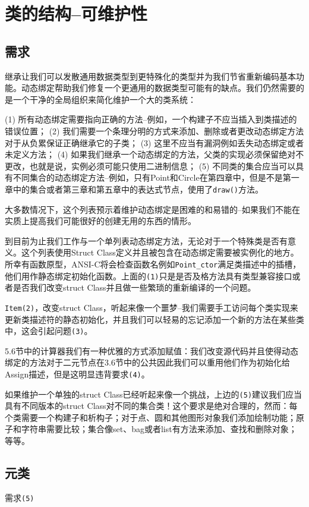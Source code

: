 \chapter{类的结构--可维护性}

\section{需求}

继承让我们可以发散通用数据类型到更特殊化的类型并为我们节省重新编码基本功能。动态绑定帮助我们修复一个更通用的数据类型可能有的缺点。我们仍然需要的是一个干净的全局组织来简化维护一个大的类系统：

(1) 所有动态绑定需要指向正确的方法--例如，一个构建子不应当插入到类描述的错误位置；
(2) 我们需要一个条理分明的方式来添加、删除或者更改动态绑定方法对于从负累保证正确继承它的子类；
(3) 这里不应当有漏洞例如丢失动态绑定或者未定义方法；
(4) 如果我们继承一个动态绑定的方法，父类的实现必须保留绝对不更改，也就是说，实例必须可能只使用二进制信息；
(5) 不同类的集合应当可以具有不同集合的动态绑定方法--例如，只有Point和Circle在第四章中，但是不是第一章中的集合或者第三章和第五章中的表达式节点，使用了\verb|draw()|方法。

大多数情况下，这个列表预示着维护动态绑定是困难的和易错的--如果我们不能在实质上提高我们可能很好的创建无用的东西的情形。

到目前为止我们工作与一个单列表动态绑定方法，无论对于一个特殊类是否有意义。这个列表使用Struct Class定义并且被包含在动态绑定需要被实例化的地方。所幸有函数原型，ANSI-C将会检查函数名例如\verb|Point_ctor|满足类描述中的插槽，他们用作静态绑定初始化函数。上面的\verb|(1)|只是是否及格方法具有类型兼容接口或者是否我们改变struct Class并且做一些繁琐的重新编译的一个问题。

\verb|Item(2)|，改变struct Class，听起来像一个噩梦--我们需要手工访问每个类实现来更新类描述符的静态初始化，并且我们可以轻易的忘记添加一个新的方法在某些类中，这会引起问题\verb|(3)|。

5.6节中的计算器我们有一种优雅的方式添加赋值：我们改变源代码并且使得动态绑定的方法对于二元节点在3.6节中的公共因此我们可以重用他们作为初始化给Assign描述，但是这明显违背要求\verb|(4)|。

如果维护一个单独的struct Class已经听起来像一个挑战，上边的\verb|(5)|建议我们应当具有不同版本的struct Class对不同的集合类！这个要求是绝对合理的，然而：每个类需要一个构建子和析构子；对于点、圆和其他图形对象我们添加绘制功能；原子和字符串需要比较；集合像set、bag或者list有方法来添加、查找和删除对象；等等。

\section{元类}

需求\verb|(5)|

